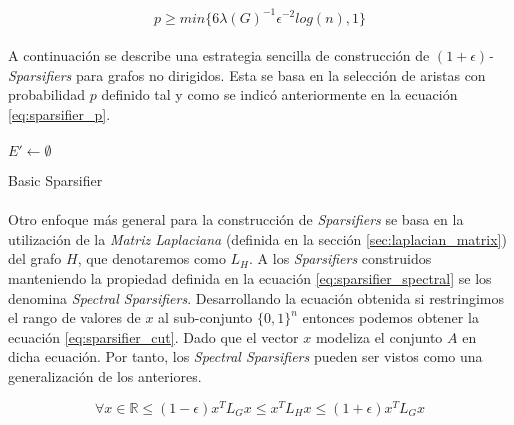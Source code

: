 \documentclass{subfiles}
\begin{document}
        \begin{equation}
        \label{eq:sparsifier_p}
          p \geq min\{6\lambda(G)^{-1}\epsilon^{-2}log(n),1\}
        \end{equation}

        \paragraph{}
        A continuación se describe una estrategia sencilla de construcción de \emph{$(1 +\epsilon)$-Sparsifiers} para grafos no dirigidos. Esta se basa en la selección de aristas con probabilidad $p$ definido tal y como se indicó anteriormente en la ecuación \eqref{eq:sparsifier_p}.

        \paragraph{}
        \begin{algorithm}
          \SetAlgoLined
          $E' \gets \emptyset$\;
          \caption{Basic Sparsifier}
          \label{code:basic_sparsifier}
        \end{algorithm}

        \paragraph{}
        Otro enfoque más general para la construcción de \emph{Sparsifiers} se basa en la utilización de la \emph{Matriz Laplaciana} (definida en la sección \ref{sec:laplacian_matrix}) del grafo $H$, que denotaremos como $L_{H}$. A los \emph{Sparsifiers} construidos manteniendo la propiedad definida en la ecuación \eqref{eq:sparsifier_spectral} se los denomina \emph{Spectral Sparsifiers}. Desarrollando la ecuación obtenida si restringimos el rango de valores de $x$ al sub-conjunto $\{ 0, 1\}^n$ entonces podemos obtener la ecuación \ref{eq:sparsifier_cut}. Dado que el vector $x$ modeliza el conjunto $A$ en dicha ecuación. Por tanto, los \emph{Spectral Sparsifiers} pueden ser vistos como una generalización de los anteriores.

        \begin{equation}
        \label{eq:sparsifier_spectral}
          \forall x \in \mathbb{R} \leq (1 - \epsilon) x^TL_{G}x \leq x^TL_{H}x \leq (1 + \epsilon) x^TL_{G}x
        \end{equation}
\end{document}
